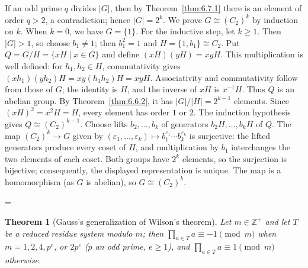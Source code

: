 \documentclass[11pt]{article}
\makeatletter
\theoremstyle{ntstyle}
\newtheorem{theorem}{Theorem}[subsection]
\let\nt@closedisplay\]
\def\nt@guardedclose{\@ifnextchar\par{\nt@closeafterpar}{\@ifnextchar\end{\postdisplaypenalty\@M\nt@closedisplay}{\nt@closedisplay}}}
\def\nt@closeafterpar\par{\@ifnextchar\par{\nt@closeafterpar}{\@ifnextchar\end{\postdisplaypenalty\@M\nt@closedisplay\par}{\nt@closedisplay\par}}}
\renewenvironment{proof}[1][\proofname]{\par
  \pushQED{\qed}\normalfont\topsep\medskipamount\edef\nt@afterproof{\@endparpenalty=\the\@endparpenalty\relax}\@beginparpenalty\@M\@endparpenalty\@M\let\]\nt@guardedclose\trivlist\item[]\textit{#1\@addpunct{.}} \ignorespaces}{\ifvmode\addpenalty\@M\fi\popQED\nt@afterproof\endtrivlist\@endpefalse}
\makeatother
\begin{document}
\begin{proof} If an odd prime $q$ divides $|G|$, then by
	Theorem~\ref{thm:6.7.1} there is an element of order $q > 2$, a contradiction;
	hence $|G| = 2^{k}$. We prove $G \cong (C_2)^{k}$ by induction on
	$k$. When $k = 0$, we have $G = \{1\}$. For the inductive step, let
	$k\ge1$. Then $|G|>1$, so choose $b_1\neq
		1$; then $b_1^2=1$ and $H = \{1, b_1\} \cong C_2$. Put
	$Q=G/H=\{xH\mid x\in G\}$ and define $(xH)(yH)=xyH$.
	This multiplication is well defined: for $h_1,h_2\in H$, commutativity gives
	$(xh_1)(yh_2)H=xy(h_1h_2)H=xyH$.
	Associativity and commutativity follow from those of $G$; the identity is
	$H$, and the inverse of $xH$ is $x^{-1}H$. Thus $Q$ is an abelian group.
	By Theorem~\ref{thm:6.6.2}, it has $|G|/|H|=2^{k-1}$ elements.
	Since $(xH)^2=x^2H=H$, every element has order $1$ or $2$.
	The induction hypothesis gives $Q\cong(C_2)^{k-1}$. Choose lifts $b_2,\ldots,b_k$ of generators $b_2H,\ldots,b_kH$ of $Q$. The map $(C_2)^k\to G$ given by $(\varepsilon_1,\ldots,\varepsilon_k)\mapsto b_1^{\varepsilon_1}\cdots b_k^{\varepsilon_k}$ is surjective: the lifted generators produce every coset of $H$, and multiplication by $b_1$ interchanges the two elements of each coset. Both groups have $2^k$ elements, so the surjection is bijective; consequently, the displayed representation is unique. The map is a homomorphism (as $G$ is
	abelian), so $G \cong (C_2)^{k}$.

\end{proof}
\begin{theorem}[Gauss's generalization of Wilson's theorem]\label{thm:6.7.3} Let $m\in\mathbb{Z}^+$ and let $T$ be a reduced residue system modulo $m$; then
	$\prod_{a \in T} a \equiv -1 \pmod{m}$ when $m = 1, 2, 4, p^{e}$, or $2
		p^{e}$ ($p$ an odd prime, $e \ge 1$), and $\prod_{a \in T} a \equiv 1 \pmod{m}$ otherwise.

\end{theorem}
\end{document}
